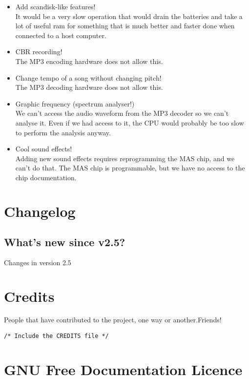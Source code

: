 {\begin{itemize}
  partition (since that is the only way the ROM can load it), and adding 
  support for more file systems will just take away valuable ram for 
  unnecessary features. You can partition your Jukebox fine, just make sure 
  the first one is FAT32 and then make the other ones whatever file system 
  you want. Just don't expect Rockbox to understand them.
\item Add scandisk{}-like features!\\
  It would be a very slow operation that would drain the batteries and 
  take a lot of useful ram for something that is much better and faster 
  done when connected to a host computer.
\item CBR recording!\\
  The MP3 encoding hardware does not allow this.
\item Change tempo of a song without changing pitch!\\
  The MP3 decoding hardware does not allow this.
\item Graphic frequency (spectrum analyser!)\\
  We can't access the audio waveform from the MP3 decoder so we can't analyse 
  it. Even if we had access to it, the CPU would probably be too slow to 
  perform the analysis anyway.
\item Cool sound effects!\\
  Adding new sound effects requires reprogramming the MAS chip, and we can't 
  do that. The MAS chip is programmable, but we have no access to the chip 
  documentation.
\end{itemize}
}


\chapter{Changelog}
\section{What's new since v2.5?}
Changes in version 2.5

\chapter{Credits}
People that have contributed to the project, one way or another.Friends!
\begin{verbatim}
/* Include the CREDITS file */
\end{verbatim}

\chapter{GNU Free Documentation Licence}

